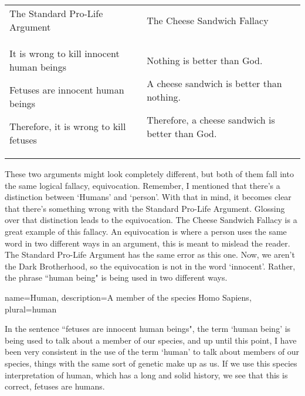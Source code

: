 \begin{tabular}{p{2in}|p{2in}}
The Standard Pro-Life Argument&The Cheese Sandwich Fallacy\\
\begin{earg}
    \item[] It is wrong to kill innocent human beings
    \item[] Fetuses are innocent human beings
    \item[] Therefore, it is wrong to kill fetuses
\end{earg}&
\begin{earg}
    \item[] Nothing is better than God.
    \item[] A cheese sandwich is better than nothing.
    \item[] Therefore, a cheese sandwich is better than God. 
\end{earg}
\end{tabular}


These two arguments might look completely different, but both of them fall into the same logical fallacy, equivocation. Remember, I mentioned that there's a distinction between `\glspl{Human}' and `person'. With that in mind, it becomes clear that there's something wrong with the Standard Pro-Life Argument. Glossing over that distinction leads to the equivocation. The Cheese Sandwich Fallacy is a great example of this fallacy. An equivocation is where a person uses the same word in two different ways in an argument, this is meant to mislead the reader.  The Standard Pro-Life Argument has the same error as this one. Now, we aren't the Dark Brotherhood, so the equivocation is not in the word `innocent'. Rather, the phrase ``human being" is being used in two different ways.

{
  name=Human,
  description={A member of the species Homo Sapiens},
  plural=human
}


In the sentence ``fetuses are innocent human beings", the term `human being' is being used to talk about a member of our species, and up until this point, I have been very consistent in the use of the term `human' to talk about members of our species, things with the same sort of genetic make up as us. If we use this species interpretation of human, which has a long and solid history, we see that this is correct, fetuses are humans.

